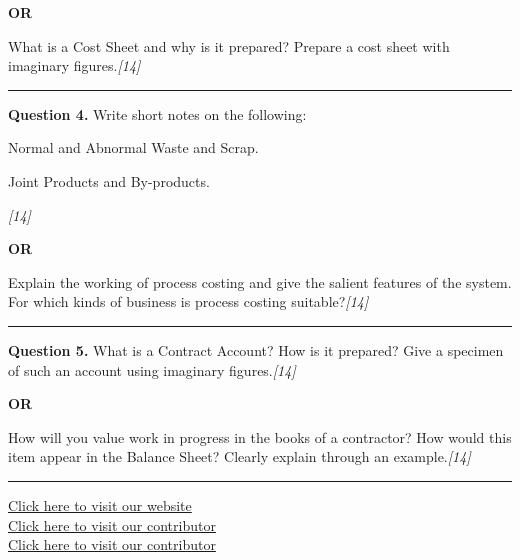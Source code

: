 \documentclass[11pt,a4paper]{article}
\newcommand{\pts}[1]{\hfill   \textit{[#1]}}
\begin{document}
\centerline{   \textbf{OR}}

What is a Cost Sheet and why is it prepared? Prepare a cost sheet with imaginary figures.\pts{14}

\medskip\rule{\linewidth}{0.2pt}

\pagebreak




\noindent   \textbf{Question 4.}
Write short notes on the following:

\begin{parts}
  \item Normal and Abnormal Waste and Scrap.
  \item Joint Products and By-products.
\end{parts}\pts{14}

\centerline{   \textbf{OR}}

Explain the working of process costing and give the salient features of the system. For which kinds of business is process costing suitable?\pts{14}

\medskip\rule{\linewidth}{0.2pt}




\noindent   \textbf{Question 5.}
What is a Contract Account? How is it prepared? Give a specimen of such an account using imaginary figures.\pts{14}

\centerline{   \textbf{OR}}

How will you value work in progress in the books of a contractor? How would this item appear in the Balance Sheet? Clearly explain through an example.\pts{14}

\vfill
\rule{\linewidth}{0.4pt}

\begin{center}\small
\href{https://bhu-exam.vercel.app/}{Click here to visit our website}\\[4pt]
\href{https://me-aryan.vercel.app/}{Click here to visit our contributor}\\[4pt]
\href{https://quashan-me.vercel.app/}{Click here to visit our contributor}
\end{center}
\end{document}
